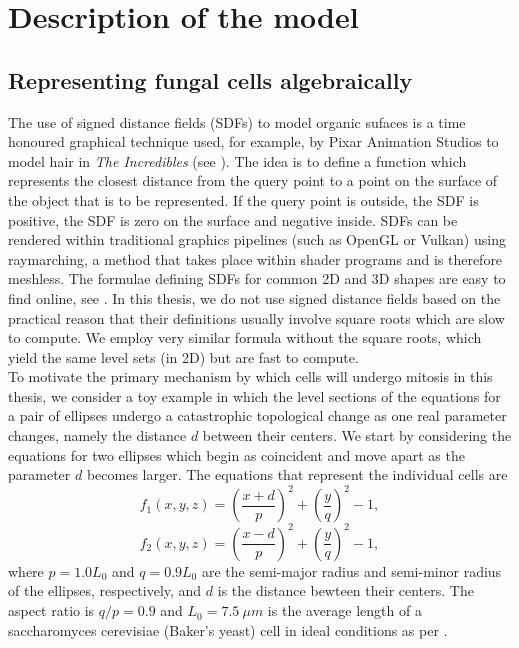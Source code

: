 \chapter{ Description of the model \label{ch:numero_uno}}
\section{Representing fungal cells algebraically}\label{sec:introSDFs}
The use of signed distance fields (SDFs) to model organic sufaces
is a time honoured graphical technique used, for example, by Pixar
Animation Studios to model hair in \textit{The Incredibles} 
(see \cite{petrovic2005volumetric}). The idea is to define a 
function which represents the closest distance from the query point
to a point on the surface of the object that is to be represented. 
If the query point is outside, the SDF is positive,
the SDF is zero on the surface and negative inside. SDFs can be 
rendered within traditional graphics pipelines (such as OpenGL or Vulkan)
using raymarching, a method that takes place within shader programs and 
is therefore meshless. The formulae defining SDFs for common 2D and 3D 
shapes are easy to find online, see \cite{key}. In this thesis,
we do not use signed distance fields based on the practical 
reason that their definitions usually involve square roots
which are slow to compute. We employ very similar formula
without the square roots, which yield the same level sets (in 2D)
but are fast to compute.
\\

To motivate the primary mechanism by which cells will undergo mitosis 
in this thesis, we consider a toy example in which the level sections of the equations for
a pair of ellipses undergo a catastrophic topological change as one real parameter 
changes, namely the distance $d$ between their centers. We start by considering 
the equations for two ellipses which 
begin as coincident and move apart as the parameter $d$ becomes larger. 
The equations that represent the individual cells are
\begin{equation*}
    f_1(x,y,z) = \left( \frac{x+d}{p} \right)^2 + \left( \frac{y}{q} \right)^2 - 1,
\end{equation*}
\begin{equation*}
    f_2(x,y,z) = \left( \frac{x-d}{p} \right)^2 + \left( \frac{y}{q} \right)^2 - 1,
\end{equation*}
where $p=1.0 L_0$ and $q=0.9 L_0$ are the semi-major radius and semi-minor radius
of the ellipses, respectively, 
and $d$ is the distance bewteen their centers. The aspect ratio is $q/p = 0.9$ and $L_0 = 7.5 \ \mu m$
is the average length of a  saccharomyces cerevisiae (Baker's yeast) cell in ideal conditions as per
\cite{chavez2024cell}.
\\

